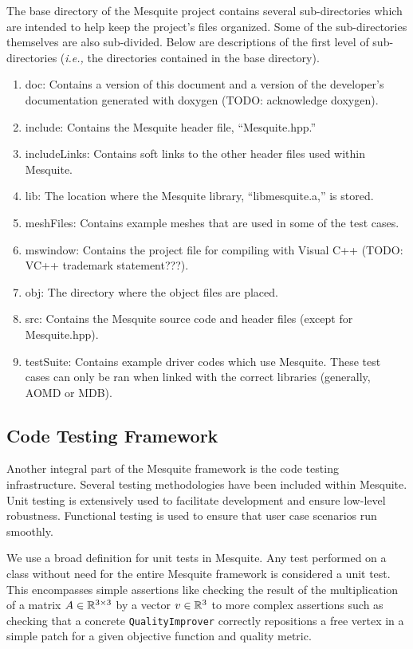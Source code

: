 The base directory of the Mesquite project contains several
sub-directories which are intended to help keep the project's
files organized.  Some of the sub-directories themselves are
also sub-divided.  Below are descriptions of the first level
of sub-directories ({\it i.e.,} the directories contained in the
base directory).
\begin{enumerate}
\item doc:  Contains a version of this document and a version of
the developer's documentation generated with doxygen (TODO: acknowledge
doxygen).
\item include:  Contains the Mesquite header file, ``Mesquite.hpp.''
\item includeLinks:  Contains soft links to the other header files
used within Mesquite.  
\item lib:  The location where the Mesquite library, ``libmesquite.a,'' is
stored.
\item meshFiles:  Contains example meshes that are used in some of
the test cases.
\item mswindow:  Contains the project file for compiling with Visual C++
(TODO: VC++ trademark statement???).
\item obj:  The directory where the object files are placed.
\item src:  Contains the Mesquite source code and header files (except for
Mesquite.hpp).
\item testSuite:  Contains example driver codes which use Mesquite.  These
test cases can only be ran when linked with the correct libraries (generally,
AOMD or MDB).
\end{enumerate}

\subsection{Code Testing Framework}

Another integral part of the Mesquite framework is the code testing
infrastructure.  Several testing methodologies have been included
within Mesquite. Unit testing is extensively used to facilitate
development and ensure low-level robustness. Functional testing is
used to ensure that user case scenarios run smoothly.

We use a broad definition for unit tests in Mesquite. Any test
performed on a class without need for the entire Mesquite framework is
considered a unit test. This encompasses simple assertions like
checking the result of the multiplication of a matrix $A \in
\Bbb{R}^{3 \times 3}$ by a vector $v \in \Bbb{R}^{3}$ to more complex
assertions such as checking that a concrete \texttt{QualityImprover}
correctly repositions a free vertex in a simple patch for a given
objective function and quality metric.

